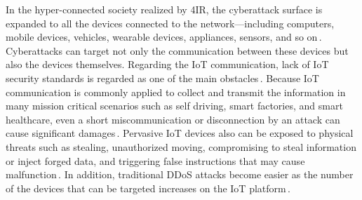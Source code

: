 \documentclass[11pt]{article}
\begin{document}
In the hyper-connected society realized by 4IR, the cyberattack surface is expanded to all the devices connected to the network---including computers, mobile devices, vehicles, wearable devices, appliances, sensors, and so on\,\cite{forbes2021}. Cyberattacks can target not only the communication between these devices but also the devices themselves. Regarding the IoT communication, lack of IoT security standards is regarded as one of the main obstacles\,\cite{Karie2021}. Because IoT communication is commonly applied to collect and transmit the information in many mission critical scenarios such as self driving, smart factories, and smart healthcare, even a short miscommunication or disconnection by an attack can cause significant damages\,\cite{Moore2020}. 
Pervasive IoT devices also can be exposed to physical threats such as stealing,  unauthorized moving, compromising to steal information or inject forged data, and triggering false instructions that may cause malfunction\,\cite{Xiao2013}. 
%
In addition, traditional DDoS attacks become easier as the number of the devices that can be targeted increases on the IoT platform\,\cite{ddos2016}. 

\end{document}
